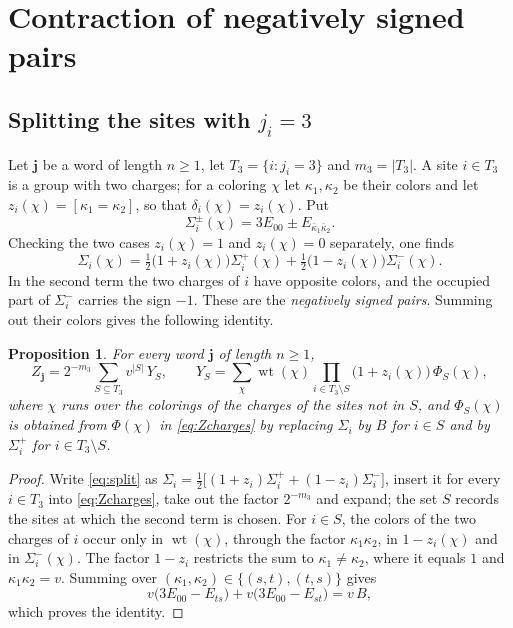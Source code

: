\documentclass{amsart}
\newtheorem{proposition}[theorem]{Proposition}
\theoremstyle{definition}
\theoremstyle{remark}
\numberwithin{equation}{section}
\newcommand{\jj}{\mathbf{j}}
\newcommand{\wt}{\operatorname{wt}}
\begin{document}
\section{Contraction of negatively signed pairs}\label{sec:contraction}

\subsection{Splitting the sites with \texorpdfstring{$j_i=3$}{j\_i=3}}
Let $\jj$ be a word of length $n\ge1$, let $T_3=\{i:j_i=3\}$ and $m_3=|T_3|$. A site $i\in T_3$ is a group with two charges; for a coloring $\chi$ let $\kappa_1,\kappa_2$ be their colors and let $z_i(\chi)=[\kappa_1=\kappa_2]$, so that $\delta_i(\chi)=z_i(\chi)$. Put
\[
\Sigma_i^\pm(\chi)=3E_{00}\pm E_{\bar\kappa_1\bar\kappa_2}.
\]
Checking the two cases $z_i(\chi)=1$ and $z_i(\chi)=0$ separately, one finds
\begin{equation}\label{eq:split}
\Sigma_i(\chi)=\tfrac12\bigl(1+z_i(\chi)\bigr)\Sigma_i^+(\chi)+\tfrac12\bigl(1-z_i(\chi)\bigr)\Sigma_i^-(\chi).
\end{equation}
In the second term the two charges of $i$ have opposite colors, and the occupied part of $\Sigma_i^-$ carries the sign $-1$. These are the \emph{negatively signed pairs}. Summing out their colors gives the following identity.

\begin{proposition}\label{prop:contraction}
For every word $\jj$ of length $n\ge1$,
\[
Z_\jj=2^{-m_3}\sum_{S\subseteq T_3}v^{|S|}\,Y_S,\qquad
Y_S=\sum_{\chi}\wt(\chi)\prod_{i\in T_3\setminus S}\bigl(1+z_i(\chi)\bigr)\,\Phi_S(\chi),
\]
where $\chi$ runs over the colorings of the charges of the sites not in $S$, and $\Phi_S(\chi)$ is obtained from $\Phi(\chi)$ in \eqref{eq:Zcharges} by replacing $\Sigma_i$ by $B$ for $i\in S$ and by $\Sigma_i^+$ for $i\in T_3\setminus S$.
\end{proposition}

\begin{proof}
Write \eqref{eq:split} as $\Sigma_i=\frac12\bigl[(1+z_i)\Sigma_i^++(1-z_i)\Sigma_i^-\bigr]$, insert it for every $i\in T_3$ into \eqref{eq:Zcharges}, take out the factor $2^{-m_3}$ and expand; the set $S$ records the sites at which the second term is chosen. For $i\in S$, the colors of the two charges of $i$ occur only in $\wt(\chi)$, through the factor $\kappa_1\kappa_2$, in $1-z_i(\chi)$ and in $\Sigma_i^-(\chi)$. The factor $1-z_i$ restricts the sum to $\kappa_1\ne\kappa_2$, where it equals $1$ and $\kappa_1\kappa_2=v$. Summing over $(\kappa_1,\kappa_2)\in\{(s,t),(t,s)\}$ gives
\[
v\bigl(3E_{00}-E_{ts}\bigr)+v\bigl(3E_{00}-E_{st}\bigr)=v\,B,
\]
which proves the identity.
\end{proof}
\end{document}
